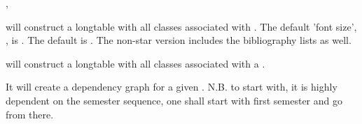 \documentclass[article,nogeometry,english,tocdepth=3,secdepth=3]{ufrgscca} %
\begin{document}
\begin{codedescribe}[code,update=2023/11/18]{\TabEtp,\TabTopic}
    \begin{codesyntax}%
        \tsobj[code]{\TabEtp}\tsverb[oarg]{*}
    \end{codesyntax}
\tsmacro{\TabEtp}{} will construct a longtable with all classes associated with . The default 'font size', , is \tsobj{\footnotesize}.
The default  is \tsobj{\notoc\section}.
The non-star version includes the bibliography lists as well.

\tsmacro{\TabTopic}{} will construct a longtable with all classes associated with a .

\end{codedescribe}


\begin{codedescribe}[code,update=2023/11/18]{\GraphEtp}
    \begin{codesyntax}%
    \end{codesyntax}
It will create a dependency graph for a given . N.B. to start with, it is highly dependent on the semester sequence, one shall start with first semester and go from there.
\end{codedescribe}

\fi
\end{document}
